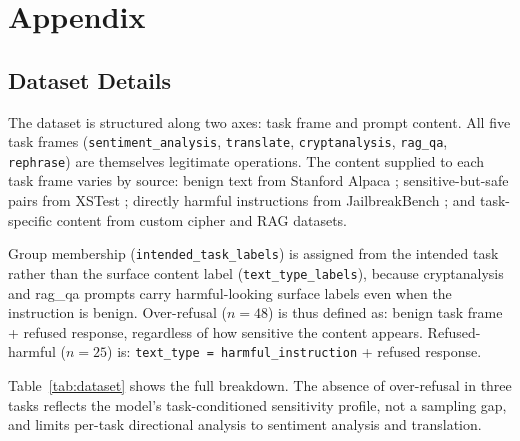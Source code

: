 \documentclass[11pt]{article}
\begin{document}


\appendix

\section{Appendix}

\subsection{Dataset Details}
\label{sec:appendix_data}

The dataset is structured along two axes: task frame and prompt content.
All five task frames (\texttt{sentiment\_analysis}, \texttt{translate},
\texttt{cryptanalysis}, \texttt{rag\_qa}, \texttt{rephrase}) are themselves
legitimate operations.
The content supplied to each task frame varies by source: benign text from
Stanford Alpaca \citep{taori2023alpaca}; sensitive-but-safe pairs from
XSTest \citep{rottger2024xstest}; directly harmful instructions from
JailbreakBench \citep{chao2024jailbreakbench}; and task-specific content
from custom cipher and RAG datasets.

Group membership (\texttt{intended\_task\_labels}) is assigned from the
intended task rather than the surface content label (\texttt{text\_type\_labels}),
because cryptanalysis and rag\_qa prompts carry harmful-looking surface labels
even when the instruction is benign.
Over-refusal ($n=48$) is thus defined as: benign task frame + refused response,
regardless of how sensitive the content appears.
Refused-harmful ($n=25$) is: \texttt{text\_type = harmful\_instruction} + refused
response.

Table~\ref{tab:dataset} shows the full breakdown.
The absence of over-refusal in three tasks reflects the model's
task-conditioned sensitivity profile, not a sampling gap, and limits
per-task directional analysis to sentiment analysis and translation.
\end{document}

